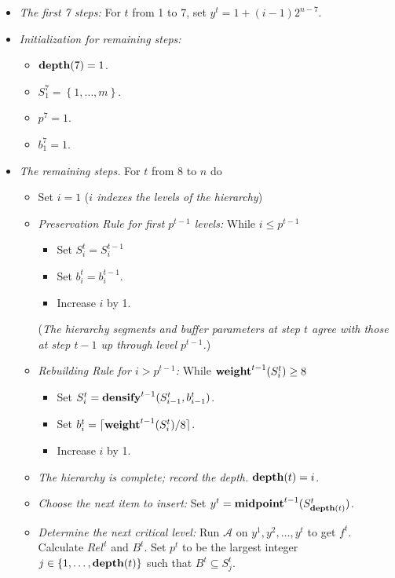 \documentclass[unicode,review]{siamart1116}
\newcommand{\A}{\mathcal{A}}
\newcommand{\natInt}[2]{ \left\{ #1, \dotsc, #2 \right\} }
\newcommand{\weight}{{\rm {\bf weight}}}
\newcommand{\midp}{{\rm {\bf midpoint}}}
\newcommand{\depth}{{\rm {\bf depth}}}
\newcommand{\densify}{{\rm {\bf densify}}}
\numberwithin{theorem}{section}
\providecommand{\DIFadd}[1]{{\protect\color{blue}\uwave{#1}}} %
\providecommand{\DIFdel}[1]{{\protect\color{red}\sout{#1}}}                      %
\providecommand{\DIFaddbegin}{} %
\providecommand{\DIFaddend}{} %
\providecommand{\DIFdelbegin}{} %
\providecommand{\DIFdelend}{} %
\newcommand{\DIFscaledelfig}{0.5}
\newlength{\DIFdelgraphicswidth} %
\newlength{\DIFdelgraphicsheight} %
\newcommand{\DIFaddincludegraphics}[2][]{{\color{blue}\fbox{\DIFOincludegraphics[#1]{#2}}}} %
\newcommand{\DIFdelincludegraphics}[2][]{%
\sbox{\DIFdelgraphicsbox}{\DIFOincludegraphics[#1]{#2}}%
\settoboxwidth{\DIFdelgraphicswidth}{\DIFdelgraphicsbox} %
\settoboxtotalheight{\DIFdelgraphicsheight}{\DIFdelgraphicsbox} %
\scalebox{\DIFscaledelfig}{%
\parbox[b]{\DIFdelgraphicswidth}{\usebox{\DIFdelgraphicsbox}\\[-\baselineskip] \rule{\DIFdelgraphicswidth}{0em}}\llap{\resizebox{\DIFdelgraphicswidth}{\DIFdelgraphicsheight}{%
\setlength{\unitlength}{\DIFdelgraphicswidth}%
\begin{picture}(1,1)%
\thicklines\linethickness{2pt} %
{\color[rgb]{1,0,0}\put(0,0){\framebox(1,1){}}}%
{\color[rgb]{1,0,0}\put(0,0){\line( 1,1){1}}}%
{\color[rgb]{1,0,0}\put(0,1){\line(1,-1){1}}}%
\end{picture}%
}\hspace*{3pt}}} %
} %
\DeclareRobustCommand{\DIFaddbegin}{\DIFOaddbegin \let\includegraphics\DIFaddincludegraphics} %
\DeclareRobustCommand{\DIFaddend}{\DIFOaddend \let\includegraphics\DIFOincludegraphics} %
\DeclareRobustCommand{\DIFdelbegin}{\DIFOdelbegin \let\includegraphics\DIFdelincludegraphics} %
\DeclareRobustCommand{\DIFdelend}{\DIFOaddend \let\includegraphics\DIFOincludegraphics} %
\begin{document}
\begin{itemize}
\iffalse
\smallskip\noindent Set $p^0=0$.
\fi
\item  \emph{The first 7 steps:} For $t$ from 1 to 7, set \DIFdelbegin \DIFdel{$y^t= 1+ (i-1)2^{n-7}$}\DIFdelend \DIFaddbegin \DIFadd{$y^t= 1+ (t-1)2^{n-7}$}\DIFaddend .

\item \emph{Initialization for remaining steps:}
\begin{itemize}
\item $\depth(7)=1$.
\item $S^7_1=\natInt{1}{m}$.
\item $p^7=1$.
\item $b^7_1=1$.
\end{itemize}
\item \emph{The remaining steps.} For $t$ from 8 to $n$ do
\begin{itemize}
\item
Set $i=1$ (\emph{$i$ indexes the levels of the hierarchy})
\item
\emph{Preservation Rule for first $p^{t-1}$ levels:} While $i \leq p^{t-1}$ 
\begin{itemize}
\item Set $S^t_i=S^{t-1}_{i}$ 
\item Set $b^t_i=b^{t-1}_i$.  
\item Increase $i$ by 1.
\end{itemize}
(\emph{The hierarchy segments and buffer parameters at step $t$ agree with those at step $t-1$ up through level $p^{t-1}$.})
\item
\emph{Rebuilding Rule for $i>p^{t-1}$:} While $\weight^{t-1}(S^t_{i}) \ge 8$
\begin{itemize}
\item Set $S^t_i = \densify^{t-1}(S^t_{i-1},b^t_{i-1})$.
\item Set $b^t_i = \lceil \weight^{t-1}(S^t_i)/8 \rceil$.
\item Increase $i$ by 1.
\end{itemize}
\item \emph{The hierarchy is complete; record the depth.}
 $\depth(t)=i$.
\item \emph{Choose the next item to insert:}
Set $y^t = \midp^{t-1}(S^t_{\depth(t)})$.
\item
\emph{Determine the next critical level:}
Run $\A$ on $y^1,y^2,\dotsc,y^t$ to get $f^t$. Calculate $Rel^t$ and $B^t$.
Set $p^{t}$ to be the largest integer $j \in \natInt{1}{\depth(t)}$ such that $B^{t} \subseteq S^{t}_j$.
\end{itemize}
\end{itemize}
\end{document}
